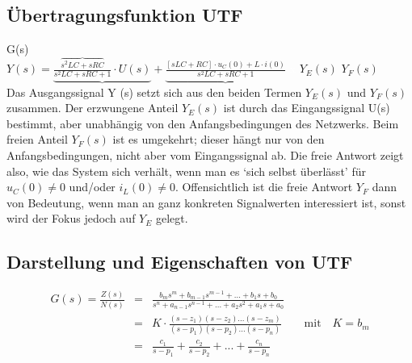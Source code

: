 \subsection{Übertragungsfunktion UTF }
\hspace{2.3cm}G(s)\\
$Y(s) = \underbrace{\frac{\overbrace{s^2 LC+sRC}}{s^2 LC +sRC +1}\cdot U(s)} + \underbrace{\frac{[sLC + RC] \cdot u_{C}(0) + L \cdot i(0)}{s^2 LC +sRC +1}}$ \newline
\textcolor{white}{x} \hspace{2.4cm} $Y_{E}(s)$ \hspace{3.8cm} $Y_{F}(s)$ \\
Das Ausgangssignal Y (s) setzt sich aus den beiden Termen $Y_{E}(s)$ und $Y_{F}(s)$ zusammen. Der erzwungene Anteil $Y_{E}(s)$ ist durch das Eingangssignal U(s) bestimmt, aber unabhängig von den Anfangsbedingungen des Netzwerks.
Beim freien Anteil $Y_{F}(s)$ ist es umgekehrt; dieser hängt nur von den Anfangsbedingungen,
nicht aber vom Eingangssignal ab. Die freie Antwort zeigt also, wie
das System sich verhält, wenn man es ‘sich selbst überlässt’
für $u_{C}(0) \neq 0$ und/oder $i_{L}(0) \neq 0$.
Offensichtlich ist die freie Antwort $Y_{F}$ dann von Bedeutung, wenn man an ganz konkreten
Signalwerten interessiert ist, sonst wird der Fokus jedoch auf $Y_{E}$ gelegt. \\

\subsection{Darstellung und Eigenschaften von UTF }

\begin{eqnarray}
G(s)=\frac{Z(s)}{N(s)}& = &\frac{b_{m}s^m + b_{m-1}s^{m-1}+ ... + b_{1}s+b_{0}}{s^{n}+a_{n-1}s^{n-1} + ... + a_{2}s^{2}+a_{1}s + a_{0}} \\ 
& = & K\cdot \frac{(s-z_{1})(s-z_{2})...(s-z_{m})}{(s-p_{1})(s-p_{2})...(s-p_{n})} \qquad \text{mit} \quad K=b_{m} \\ 
& = & \frac{c_{1}}{s-p_{1}} + \frac{c_{2}}{s-p_{2}} + ...  + \frac{c_{n}}{s-p_{n}}
\end{eqnarray}

